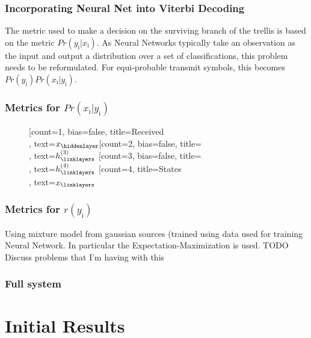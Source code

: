 \documentclass[10pt,tgadventor, onlymath]{beamer}
\begin{document}
\begin{frame}
	\frametitle{Incorporating Neural Net into Viterbi Decoding}
	The metric used to make a decision on the surviving branch of the trellis is based on the metric 
	$Pr(y_{\mathrm{i}}|x_{\mathrm{i}})$. As Neural Networks typically take an observation as the input and output a distribution over a set of classifications, this problem needs to be reformulated.
	For equi-probable transmit symbols, this becomes $Pr(y_{\mathrm{i}}) Pr(x_{\mathrm{i}}|y_{\mathrm{i}})$.
	
\end{frame}


\begin{frame}[fragile]
	\frametitle{Metrics for $Pr(x_{\mathrm{i}}|y_{\mathrm{i}})$}
	\begin{figure}
		\begin{neuralnetwork}[height=4, nodespacing=10mm, layerspacing=15mm]
		\newcommand{\x}[2]{$x_#2$}
		\newcommand{\y}[2]{$\hat{y}_#2$}
		\newcommand{\hfirst}[2]{\small $h^{(1)}_#2$}
		\newcommand{\hsecond}[2]{\small $h^{(2)}_#2$}
		\newcommand{\hthird}[2]{\small $h^{(3)}_#2$}
		\newcommand{\hfourth}[2]{\small $h^{(4)}_#2$}
		[count=1, bias=false, title=Received\\, text=\x]
		\hiddenlayer[count=2, bias=false, title=\\, text=\hthird] \linklayers
		\hiddenlayer[count=3, bias=false, title=\\, text=\hfourth] \linklayers
		\outputlayer[count=4, title=States\\, text=\x] \linklayers
	    \end{neuralnetwork}
	\end{figure}
\end{frame}


\begin{frame}
	\frametitle{Metrics for $r(y_{\mathrm{i}})$}
	Using mixture model from gaussian sources (trained using data used for training Neural Network.
	In particular the Expectation-Maximization is used.
	TODO Discuss problems that I'm having with this
\end{frame}


\begin{frame}
	\frametitle{Full system}

\end{frame}


\section{Initial Results}
\end{document}
